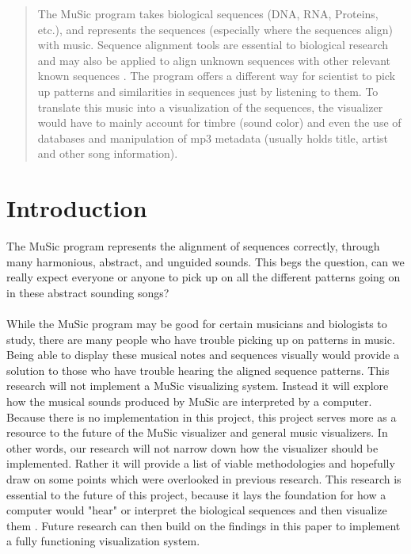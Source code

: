 \documentclass[11pt]{article}
\begin{document}

\begin{quote}
The MuSic program takes biological sequences (DNA, RNA, Proteins, etc.), and represents the sequences (especially where the sequences align) with music. Sequence alignment tools are essential to biological research and may also be applied to align unknown sequences with other relevant known sequences \cite{}. The program offers a different way for scientist to pick up patterns and similarities in sequences just by listening to them. To translate this music into a visualization of the sequences, the visualizer would have to mainly account for timbre (sound color) and even the use of databases and manipulation of mp3 metadata (usually holds title, artist and other song information).
\end{quote}

\section{Introduction}
\label{sec:introduction}
\vspace*{-.1in}


The MuSic program represents the alignment of sequences correctly, through many harmonious, abstract, and unguided sounds. This begs the question, can we really expect everyone or anyone to pick up on all the different patterns going on in these abstract sounding songs? \\ \\
While the MuSic program may be good for certain musicians and biologists to study, there are many people who have trouble picking up on patterns in music. Being able to display these musical notes and sequences visually would provide a solution to those who have trouble hearing the aligned sequence patterns. This research will not implement a MuSic visualizing system. Instead it will explore how the musical sounds produced by MuSic are interpreted by a computer. Because there is no implementation in this project, this project serves more as a resource to the future of the MuSic visualizer and general music visualizers. In other words, our research will not narrow down how the visualizer should be implemented. Rather it will provide a list of viable methodologies and hopefully draw on some points which were overlooked in previous research. This research is essential to the future of this project, because it lays the foundation for how a computer would "hear" or interpret the biological sequences and then visualize them \cite{}. Future research can then build on the findings in this paper to implement a fully functioning visualization system. 
\end{document}
